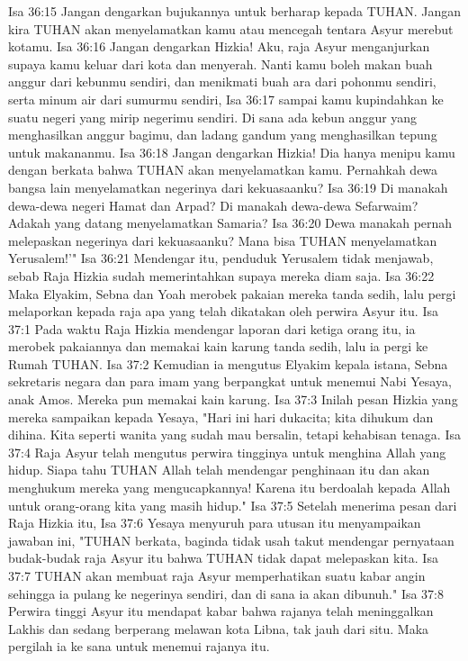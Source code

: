 Isa 36:15  Jangan dengarkan bujukannya untuk berharap kepada TUHAN. Jangan kira TUHAN akan menyelamatkan kamu atau mencegah tentara Asyur merebut kotamu.
Isa 36:16  Jangan dengarkan Hizkia! Aku, raja Asyur menganjurkan supaya kamu keluar dari kota dan menyerah. Nanti kamu boleh makan buah anggur dari kebunmu sendiri, dan menikmati buah ara dari pohonmu sendiri, serta minum air dari sumurmu sendiri,
Isa 36:17  sampai kamu kupindahkan ke suatu negeri yang mirip negerimu sendiri. Di sana ada kebun anggur yang menghasilkan anggur bagimu, dan ladang gandum yang menghasilkan tepung untuk makananmu.
Isa 36:18  Jangan dengarkan Hizkia! Dia hanya menipu kamu dengan berkata bahwa TUHAN akan menyelamatkan kamu. Pernahkah dewa bangsa lain menyelamatkan negerinya dari kekuasaanku?
Isa 36:19  Di manakah dewa-dewa negeri Hamat dan Arpad? Di manakah dewa-dewa Sefarwaim? Adakah yang datang menyelamatkan Samaria?
Isa 36:20  Dewa manakah pernah melepaskan negerinya dari kekuasaanku? Mana bisa TUHAN menyelamatkan Yerusalem!'"
Isa 36:21  Mendengar itu, penduduk Yerusalem tidak menjawab, sebab Raja Hizkia sudah memerintahkan supaya mereka diam saja.
Isa 36:22  Maka Elyakim, Sebna dan Yoah merobek pakaian mereka tanda sedih, lalu pergi melaporkan kepada raja apa yang telah dikatakan oleh perwira Asyur itu.
Isa 37:1  Pada waktu Raja Hizkia mendengar laporan dari ketiga orang itu, ia merobek pakaiannya dan memakai kain karung tanda sedih, lalu ia pergi ke Rumah TUHAN.
Isa 37:2  Kemudian ia mengutus Elyakim kepala istana, Sebna sekretaris negara dan para imam yang berpangkat untuk menemui Nabi Yesaya, anak Amos. Mereka pun memakai kain karung.
Isa 37:3  Inilah pesan Hizkia yang mereka sampaikan kepada Yesaya, "Hari ini hari dukacita; kita dihukum dan dihina. Kita seperti wanita yang sudah mau bersalin, tetapi kehabisan tenaga.
Isa 37:4  Raja Asyur telah mengutus perwira tingginya untuk menghina Allah yang hidup. Siapa tahu TUHAN Allah telah mendengar penghinaan itu dan akan menghukum mereka yang mengucapkannya! Karena itu berdoalah kepada Allah untuk orang-orang kita yang masih hidup."
Isa 37:5  Setelah menerima pesan dari Raja Hizkia itu,
Isa 37:6  Yesaya menyuruh para utusan itu menyampaikan jawaban ini, "TUHAN berkata, baginda tidak usah takut mendengar pernyataan budak-budak raja Asyur itu bahwa TUHAN tidak dapat melepaskan kita.
Isa 37:7  TUHAN akan membuat raja Asyur memperhatikan suatu kabar angin sehingga ia pulang ke negerinya sendiri, dan di sana ia akan dibunuh."
Isa 37:8  Perwira tinggi Asyur itu mendapat kabar bahwa rajanya telah meninggalkan Lakhis dan sedang berperang melawan kota Libna, tak jauh dari situ. Maka pergilah ia ke sana untuk menemui rajanya itu.
